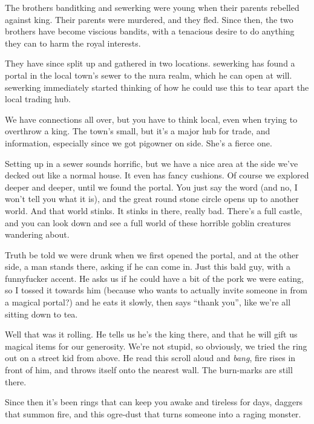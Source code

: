 \begin{multicols}{2}

The brothers \gls{banditking} and \gls{sewerking} were young when their parents rebelled against \gls{king}.
Their parents were murdered, and they fled.
Since then, the two brothers have become viscious bandits, with a tenacious desire to do anything they can to harm the royal interests.

They have since split up and gathered in two locations.
\Gls{sewerking} has found a portal in the local town's sewer to the nura realm, which he can open at will.
\Gls{sewerking} immediately started thinking of how he could use this to tear apart the local trading hub.

\begin{exampletext}

	We have connections all over, but you have to think local, even when trying to overthrow a king.  The town's small, but it's a major hub for trade, and information, especially since we got \gls{pigowner} on side.  She's a fierce one.

	Setting up in a sewer sounds horrific, but we have a nice area at the side we've decked out like a normal house.
	It even has fancy cushions.
	Of course we explored deeper and deeper, until we found the portal.
	You just say the word (and no, I won't tell you what it is), and the great round stone circle opens up to another world.
	And that world stinks.
	It stinks in there, really bad.
	There's a full castle, and you can look down and see a full world of these horrible goblin creatures wandering about.

	Truth be told we were drunk when we first opened the portal, and at the other side, a man stands there, asking if he can come in.
	Just this bald guy, with a funnyfucker accent.
	He asks us if he could have a bit of the pork we were eating, so I tossed it towards him (because who wants to actually invite someone in from a magical portal?) and he eats it slowly, then says ``thank you'', like we're all sitting down to tea.

	Well that was it rolling.  He tells us he's the king there, and that he will gift us magical items for our generosity.  We're not stupid, so obviously, we tried the ring out on a street kid from above.  He read this scroll aloud and \emph{bang}, fire rises in front of him, and throws itself onto the nearest wall.  The burn-marks are still there.

	Since then it's been rings that can keep you awake and tireless for days, daggers that summon fire, and this ogre-dust that turns someone into a raging monster.


\end{exampletext}
\end{multicols}
